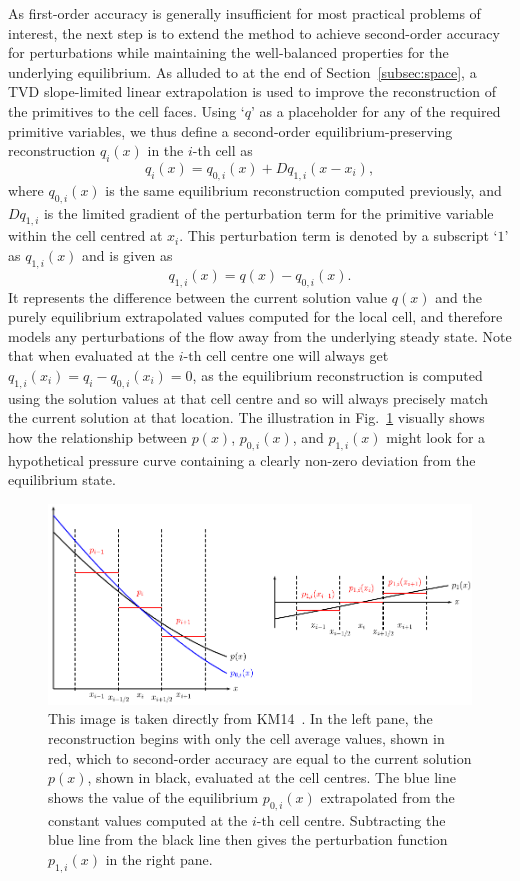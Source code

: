 As first-order accuracy is generally insufficient for most practical problems of interest, the next step is to extend the method to achieve second-order accuracy for perturbations while maintaining the well-balanced properties for the underlying equilibrium. As alluded to at the end of Section~\ref{subsec:space}, a TVD slope-limited linear extrapolation is used to improve the reconstruction of the primitives to the cell faces. Using `$q$' as a placeholder for any of the required primitive variables, we thus define a second-order equilibrium-preserving reconstruction $q_i(x)$ in the $i\textrm{-th}$ cell as
\begin{equation}
q_i(x)=q_{0,i}(x)+Dq_{1,i}(x-x_i),
\end{equation}
where $q_{0,i}(x)$ is the same equilibrium reconstruction computed previously, and $Dq_{1,i}$ is the limited gradient of the perturbation term for the primitive variable within the cell centred at $x_i$. This perturbation term is denoted by a subscript `$1$' as $q_{1,i}(x)$ and is given as
\begin{equation}
q_{1,i}(x)=q(x)-q_{0,i}(x).
\end{equation}
It represents the difference between the current solution value $q(x)$ and the purely equilibrium extrapolated values computed for the local cell, and therefore models any perturbations of the flow away from the underlying steady state. Note that when evaluated at the $i\textrm{-th}$ cell centre one will always get $q_{1,i}(x_i)=q_i-q_{0,i}(x_i)=0$, as the equilibrium reconstruction is computed using the solution values at that cell centre and so will always precisely match the current solution at that location. The illustration in Fig.~\ref{fig:Kappeli1} visually shows how the relationship between $p(x)$, $p_{0,i}(x)$, and $p_{1,i}(x)$ might look for a hypothetical pressure curve containing a clearly non-zero deviation from the equilibrium state.
\begin {figure}
\centering
\includegraphics[width=13cm]{figures/Kaeppeli1}
\caption{This image is taken directly from KM14~\cite{Kappeli2014}. In the left pane, the reconstruction begins with only the cell average values, shown in red, which to second-order accuracy are equal to the current solution $p(x)$, shown in black, evaluated at the cell centres. The blue line shows the value of the equilibrium $p_{0,i}(x)$ extrapolated from the constant values computed at the $i\textrm{-th}$ cell centre. Subtracting the blue line from the black line then gives the perturbation function $p_{1,i}(x)$ in the right pane.}
\label{fig:Kappeli1}
\end{figure}

